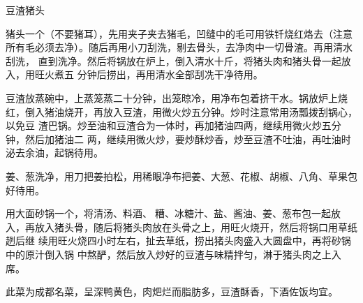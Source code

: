 \begin{recipe}{豆渣猪头}

\ingredients


\preparation

\step 猪头一个（不要猪耳），先用夹子夹去猪毛，凹缝中的毛可用铁钎烧红烙去（注意
所有毛必须去净）。随后再用小刀刮洗，剔去骨头，去净肉中一切骨渣。再用清水刮洗，
直到洗净。然后将锅放在炉上，倒入清水十斤，将猪头肉和猪头骨一起放入，用旺火煮五
分钟后捞出，再用清水全部刮冼干净待用。

\step 豆渣放蒸碗中，上蒸笼蒸二十分钟，出笼晾冷，用净布包着挤干水。锅放炉上烧
红，倒入猪油烧开，再放入豆渣，用微火炒五分钟。炒时注意常用汤瓢拨刮锅心，以免豆
渣巴锅。炒至油和豆渣合为一体时，再加猪油四两，继续用微火炒五分钟，然后加猪油二
两，继续用微火炒，要炒酥炒香，炒至豆渣不吐油，再吐油时泌去余油，起锅待用。

\step 姜、葱洗净，用刀把姜拍松，用稀眼净布把姜、大葱、花椒、胡椒、八角、草果包
好待用。

\step 用大面砂锅一个，将清汤、料酒、𰪿糟、冰糖汁、盐、酱油、姜、葱布包一起放
入，再放入猪头骨，随后将猪头肉放在头骨之上，用旺火烧开，然后将锅口用草纸趔后继
续用旺火烧四小时左右，扯去草纸，捞出猪头肉盛入大圆盘中，再将砂锅中的原汁倒入锅
中熬酽，然后放入炒好的豆渣与味精拌匀，淋于猪头肉之上入席。

\features

此菜为成都名菜，呈深鸭黄色，肉𤆵烂而脂肪多，豆渣酥香，下酒佐饭均宜。

\end{recipe}

